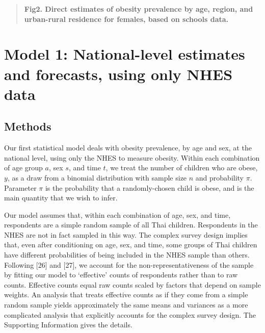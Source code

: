 \documentclass[10pt,letterpaper]{article}
\begin{document}
\begin{quote}
\textbf{Fig2. Direct estimates of obesity prevalence by age, region, and urban-rural residence for females, based on schools data.}
\end{quote}

\hypertarget{model-1-national-level-estimates-and-forecasts-using-only-nhes-data}{%
\section{Model 1: National-level estimates and forecasts, using only
NHES
data}\label{model-1-national-level-estimates-and-forecasts-using-only-nhes-data}}

\hypertarget{methods}{%
\subsection{Methods}\label{methods}}

Our first statistical model deals with obesity prevalence, by age and
sex, at the national level, using only the NHES to measure obesity.
Within each combination of age group \(a\), sex \(s\), and time \(t\),
we treat the number of children who are obese, \(y\), as a draw from a
binomial distribution with sample size \(n\) and probability \(\pi\).
Parameter \(\pi\) is the probability that a randomly-chosen child is
obese, and is the main quantity that we wish to infer.

Our model assumes that, within each combination of age, sex, and time,
respondents are a simple random sample of all Thai children. Respondents
in the NHES are not in fact sampled in this way. The complex survey
design implies that, even after conditioning on age, sex, and time, some
groups of Thai children have different probabilities of being included
in the NHES sample than others. Following {[}26{]} and {[}27{]}, we
account for the non-representativeness of the sample by fitting our
model to `effective' counts of respondents rather than to raw counts.
Effective counts equal raw counts scaled by factors that depend on
sample weights. An analysis that treats effective counts as if they come
from a simple random sample yields approximately the same means and
variances as a more complicated analysis that explicitly accounts for
the complex survey design. The Supporting Information gives the details.
\end{document}
